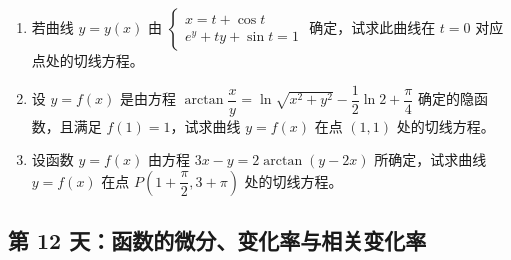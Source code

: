 \begin{enumerate}[label=\textbf{\arabic*.}, itemsep=5cm]
    \item 若曲线 $y = y(x)$ 由 $\begin{cases} x = t + \cos t \\ e^y + ty + \sin t = 1 \end{cases}$ 确定，试求此曲线在 $t=0$ 对应点处的切线方程。

    \item 设 $y = f(x)$ 是由方程 $\arctan \dfrac{x}{y} = \ln \sqrt{x^2 + y^2} - \dfrac{1}{2} \ln 2 + \dfrac{\pi}{4}$ 确定的隐函数，且满足 $f(1) = 1$，试求曲线 $y = f(x)$ 在点 $(1, 1)$ 处的切线方程。

    \item 设函数 $y = f(x)$ 由方程 $3x - y = 2\arctan(y - 2x)$ 所确定，试求曲线 $y = f(x)$ 在点 $P \left( 1 + \dfrac{\pi}{2}, 3 + \pi \right)$ 处的切线方程。
\end{enumerate}

\newpage
\subsection*{第 12 天：函数的微分、变化率与相关变化率}

